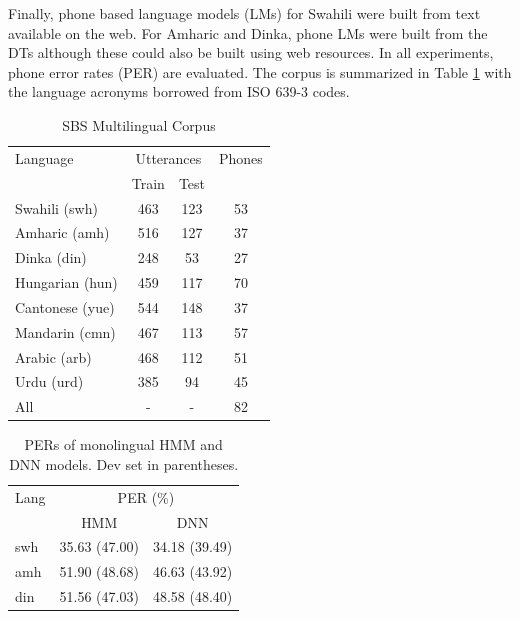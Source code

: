 \documentclass[a4paper]{article}
\begin{document}
Finally, phone based language models (LMs) for Swahili were built from text available on the web. For Amharic and Dinka, phone LMs were built from the DTs although these could also be built using web resources. In all experiments, phone error rates (PER) are evaluated. The corpus is summarized in Table \ref{Tab:SBS Corpus} with the language acronyms borrowed from ISO 639-3 codes.
%
\begin{table}[t]
\begin{center}
\caption{SBS Multilingual Corpus}
\label{Tab:SBS Corpus}
\begin{tabular}{l|c c| c}
   \hline
Language &  \multicolumn{2}{c|}{Utterances}  & Phones \\ 
                 &  Train & Test &  \\ \hline
Swahili (swh)     & 463 & 123 & 53 \\
Amharic (amh)     & 516 & 127 & 37 \\
Dinka   (din)     & 248 &  53 & 27 \\ 
Hungarian (hun)    & 459 & 117 & 70 \\ 
Cantonese (yue)  & 544 & 148 &  37 \\ 
Mandarin (cmn) & 467 & 113 &  57 \\ 
Arabic (arb) & 468 & 112 &  51 \\ 
Urdu (urd) & 385 & 94 &  45 \\ \hline
All & - & - & 82 \\ \hline
\end{tabular}
\vspace{-5mm}
\end{center}
\end{table}

\begin{table}
\centering %
\caption{PERs of monolingual HMM and DNN models. Dev set in parentheses.}
\begin{tabular}{l|c c}
   \hline
Lang  & \multicolumn{2}{c}{PER (\%)} \\
          & HMM     & DNN   \\ \hline
swh        & 35.63 (47.00)   & 34.18 (39.49)   \\
amh        & 51.90 (48.68)   & 46.63 (43.92)   \\ 
din        & 51.56 (47.03)   & 48.58 (48.40)  \\ \hline 
\end{tabular}
\vspace{-5mm}
\label{Tab:PER_Matched_Monolingual}
\end{table}
\end{document}
